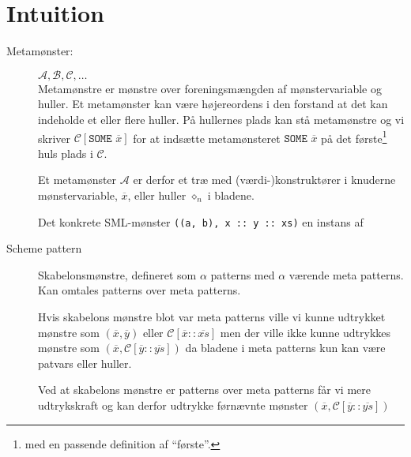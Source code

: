 \section{Intuition}

\begin{description}
\item[Metamønster:] $\mathcal{A}, \mathcal{B}, \mathcal{C}, \ldots$\\
  Metamønstre er mønstre over foreningsmængden af mønstervariable og huller.
  Et metamønster kan være højereordens i den forstand at det kan indeholde et
  eller flere huller. På hullernes plads kan stå metamønstre og vi skriver
  $\mathcal{C}[\texttt{SOME } \overline{x}]$ for at indsætte metamønsteret
  $\texttt{SOME } \overline{x}$ på det første\footnote{med en passende
    definition af ``første''.} huls plads i $\mathcal{C}$.

  Et metamønster $\mathcal{A}$ er derfor et træ med (værdi-)konstruktører i
  knuderne mønstervariable, $\overline{x}$, eller huller $\diamond_n$ i bladene.

  Det konkrete SML-mønster \texttt{((a,\ b),\ x\ ::\ y\ ::\ xs)} en instans af



\item[Scheme pattern] Skabelonsmønstre, defineret som $\alpha$ patterns med
  $\alpha$ værende meta patterns. Kan omtales patterns over meta patterns.

  Hvis skabelons mønstre blot var meta patterns ville vi kunne udtrykket mønstre
  som $(\overline{x}, \overline{y})$ eller $\mathcal{C}[\overline{x} ::
  \overline{xs}]$ men der ville ikke kunne udtrykkes mønstre som $(\overline{x},
  \mathcal{C}[\overline{y} :: \overline{ys}])$ da bladene i meta patterns kun
  kan være patvars eller huller.

  Ved at skabelons mønstre er patterns over meta patterns får vi mere
  udtrykskraft og kan derfor udtrykke førnævnte mønster $(\overline{x},
  \mathcal{C}[\overline{y} :: \overline{ys}])$


\end{description}
